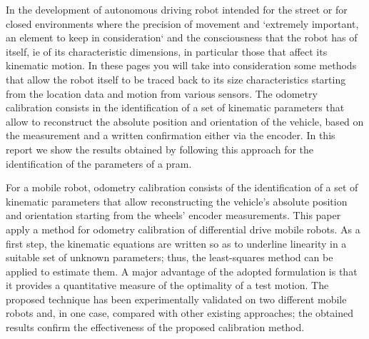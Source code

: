 \noindent In the development of autonomous driving robot intended for the street or for closed environments where the precision of movement and `extremely important, an element to keep in consideration` and the consciousness that the robot has of itself, ie of its characteristic dimensions, in particular those that affect its kinematic motion. In these pages you will take into consideration some methods that allow the robot itself to be traced back to its size characteristics starting from the location data and motion from various sensors.
\noindent
The odometry calibration consists in the identification of a set of kinematic parameters that allow to reconstruct the absolute position and orientation of the vehicle, based on the measurement and a written confirmation either via the encoder. In this report we show the results obtained by following this approach for the identification of the parameters of a pram.


\noindent For a mobile robot, odometry calibration consists of the identification of a set of kinematic parameters that allow reconstructing the vehicle’s absolute position and orientation starting from the wheels’ encoder measurements. This paper apply a method  for odometry calibration of differential drive mobile robots. As a first step, the kinematic equations are written so as to underline linearity in a suitable set of unknown parameters; thus, the least-squares method can be applied to estimate them. A major advantage of the adopted formulation is that it provides a quantitative measure of the optimality of a test motion. The proposed technique has been experimentally validated on two different mobile robots and, in one case, compared with other existing approaches; the obtained results confirm the effectiveness of the proposed calibration method.
